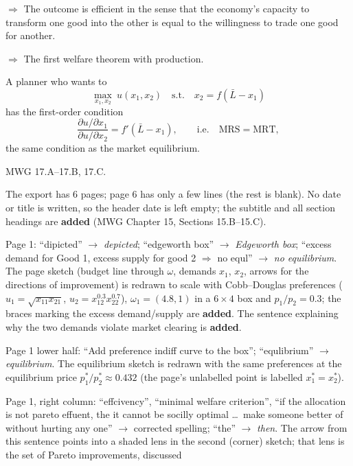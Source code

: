 \documentclass[11pt]{article}
\begin{document}
$\Rightarrow$ The outcome is efficient in the sense that the economy's capacity to
transform one good into the other is equal to the willingness to trade one good for
another.

$\Rightarrow$ The first welfare theorem with production.

A planner who wants to
\[ \max_{x_1,x_2}\ u(x_1,x_2)\quad\text{s.t.}\quad x_2=f(\bar L-x_1) \]
has the first-order condition
\[ \frac{\partial u/\partial x_1}{\partial u/\partial x_2}=f'(\bar L-x_1),
   \qquad\text{i.e.}\quad \text{MRS}=\text{MRT}, \]
the same condition as the market equilibrium.

 MWG 17.A--17.B, 17.C.


\begin{transcriptnotes}
  \item The export has 6 pages; page 6 has only a few lines (the rest is blank). No date or
        title is written, so the header date is left empty; the subtitle and all section
        headings are \textbf{added} (MWG Chapter 15, Sections 15.B--15.C).
  \item Page 1: ``dipicted'' $\to$ \emph{depicted}; ``edgeworth box'' $\to$
        \emph{Edgeworth box}; ``excess demand for Good 1, excess supply for good 2
        $\Rightarrow$ no equl'' $\to$ \emph{no equilibrium}. The page sketch (budget line
        through $\omega$, demands $x_1$, $x_2$, arrows for the directions of improvement)
        is redrawn to scale with Cobb--Douglas preferences ($u_1=\sqrt{x_{11}x_{21}}$,
        $u_2=x_{12}^{0.3}x_{22}^{0.7}$), $\omega_1=(4.8,1)$ in a $6\times4$ box and
        $p_1/p_2=0.3$; the braces marking the excess demand/supply are \textbf{added}.
        The sentence explaining why the two demands violate market clearing is
        \textbf{added}.
  \item Page 1 lower half: ``Add preference indiff curve to the box''; ``equlibrium''
        $\to$ \emph{equilibrium}. The equilibrium sketch is redrawn with the same
        preferences at the equilibrium price $p_1^*/p_2^*\approx0.432$ (the page's
        unlabelled point is labelled $x_1^*=x_2^*$).
  \item Page 1, right column: ``effcivency'', ``minimal welfare criterion'', ``if the
        allocation is not pareto effuent, the it cannot be socilly optimal \ldots\ make
        someone better of without hurting any one'' $\to$ corrected spelling; ``the''
        $\to$ \emph{then}. The arrow from this sentence points into a shaded lens in the
        second (corner) sketch; that lens is the set of Pareto improvements, discussed

\end{transcriptnotes}
\end{document}
